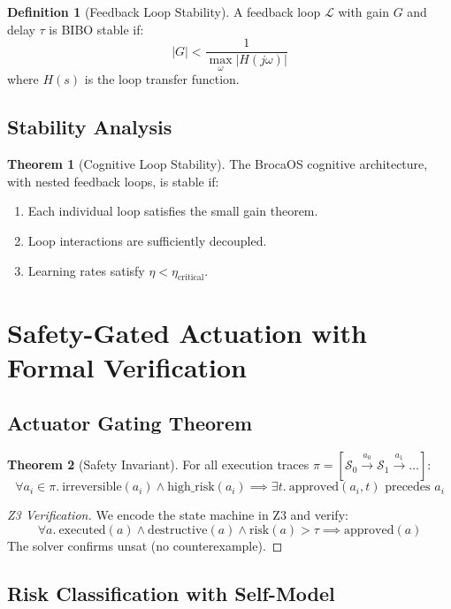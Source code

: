 \documentclass[12pt]{article}
\theoremstyle{definition}
\newtheorem{definition}{Definition}[section]
\newtheorem{theorem}{Theorem}[section]
\newcommand{\state}{\mathcal{S}}
\newcommand{\feedback}{\mathcal{L}}
\begin{document}
\begin{definition}[Feedback Loop Stability]
A feedback loop $\feedback$ with gain $G$ and delay $\tau$ is BIBO stable if:
\[
|G| < \frac{1}{\max_\omega |H(j\omega)|}
\]
where $H(s)$ is the loop transfer function.
\end{definition}

\subsection{Stability Analysis}

\begin{theorem}[Cognitive Loop Stability]
The BrocaOS cognitive architecture, with nested feedback loops, is stable if:
\begin{enumerate}
    \item Each individual loop satisfies the small gain theorem.
    \item Loop interactions are sufficiently decoupled.
    \item Learning rates satisfy $\eta < \eta_{\text{critical}}$.
\end{enumerate}
\end{theorem}

\section{Safety-Gated Actuation with Formal Verification}

\subsection{Actuator Gating Theorem}

\begin{theorem}[Safety Invariant]
For all execution traces $\pi = [\state_0 \xrightarrow{a_0} \state_1 \xrightarrow{a_1} \dots]$:
\[
\forall a_i \in \pi.\ \text{irreversible}(a_i) \land \text{high\_risk}(a_i) \implies \exists t.\ \text{approved}(a_i, t) \text{ precedes } a_i
\]
\end{theorem}

\begin{proof}[Z3 Verification]
We encode the state machine in Z3 and verify:
\[
\forall a.\ \text{executed}(a) \land \text{destructive}(a) \land \text{risk}(a) > \tau \implies \text{approved}(a)
\]
The solver confirms unsat (no counterexample).
\end{proof}

\subsection{Risk Classification with Self-Model}
\end{document}
